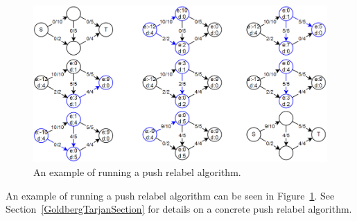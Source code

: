 \begin{figure}[!ht]
\centering
\includegraphics[width=120mm]{pushRelabelExample.png}
\caption{An example of running a push relabel algorithm.}
\label{pushRelabelExample}
\end{figure}

An example of running a push relabel algorithm can be seen in Figure~\ref{pushRelabelExample}.
See Section~\ref{GoldbergTarjanSection} for details on a concrete push relabel algorithm.